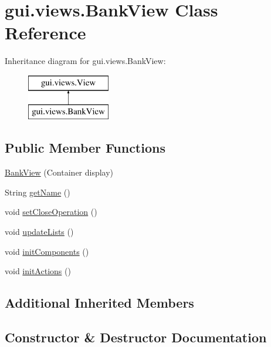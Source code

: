 \hypertarget{classgui_1_1views_1_1_bank_view}{}\section{gui.\+views.\+Bank\+View Class Reference}
\label{classgui_1_1views_1_1_bank_view}
Inheritance diagram for gui.\+views.\+Bank\+View\+:\begin{figure}[H]
\begin{center}
\leavevmode
\includegraphics[height=2.000000cm]{classgui_1_1views_1_1_bank_view}
\end{center}
\end{figure}
\subsection*{Public Member Functions}
\begin{DoxyCompactItemize}
\item 
\mbox{\hyperlink{classgui_1_1views_1_1_bank_view_a89e587390ff1f18d69ef65b49fb8814d}{Bank\+View}} (Container display)
\item 
String \mbox{\hyperlink{classgui_1_1views_1_1_bank_view_ac5a8f5a66514f19790341a4ebfa8afa7}{get\+Name}} ()
\item 
void \mbox{\hyperlink{classgui_1_1views_1_1_bank_view_a60c0ec356e0a071e0a7c36b9aa9a7e55}{set\+Close\+Operation}} ()
\item 
void \mbox{\hyperlink{classgui_1_1views_1_1_bank_view_a01f6403f48d1ba9efd3bd9486170f68f}{update\+Lists}} ()
\item 
void \mbox{\hyperlink{classgui_1_1views_1_1_bank_view_a01f3aef7981cc38cbbde788cf508bb3e}{init\+Components}} ()
\item 
void \mbox{\hyperlink{classgui_1_1views_1_1_bank_view_a4e7ef9c3f0d99d799c09bc8a1c555ae0}{init\+Actions}} ()
\end{DoxyCompactItemize}
\subsection*{Additional Inherited Members}


\subsection{Constructor \& Destructor Documentation}
\mbox{\label{classgui_1_1views_1_1_bank_view_a89e587390ff1f18d69ef65b49fb8814d}} 
